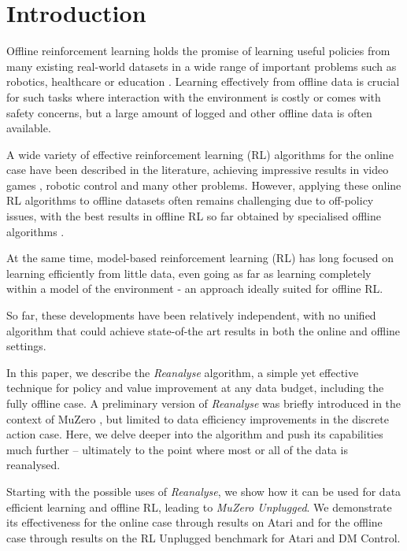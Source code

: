 \documentclass{article}
\newcommand{\reanalyse}{\emph{Reanalyse}}
\newcommand{\mzunplugged}{\emph{MuZero Unplugged}}
\begin{document}
\section{Introduction}

Offline reinforcement learning holds the promise of learning useful policies from many existing real-world datasets in a wide range of important problems such as robotics, healthcare or education \cite{levine2020offline}. Learning effectively from offline data is crucial for such tasks where interaction with the environment is costly or comes with safety concerns, but a large amount of logged and other offline data is often available.

A wide variety of effective reinforcement learning (RL) algorithms for the online case have been described in the literature, achieving impressive results in video games \cite{dqn}, robotic control \cite{akkaya2019solving} and many other problems. However, applying these online RL algorithms to offline datasets often remains challenging due to off-policy issues, with the best results in offline RL so far obtained by specialised offline algorithms \cite{kumar2020conservative,wang2020critic,agarwal2020optimistic}.

At the same time, model-based reinforcement learning (RL) has long focused on learning efficiently from little data, even going as far as learning completely within a model of the environment \cite{hafner:planet} - an approach ideally suited for offline RL.

So far, these developments have been relatively independent, with no unified algorithm that could achieve state-of-the art results in both the online and offline settings.

In this paper, we describe the \reanalyse{} algorithm, a simple yet effective technique for policy and value improvement at any data budget, including the fully offline case. A preliminary version of \reanalyse{} was briefly introduced in the context of MuZero \cite{muzero}, but limited to data efficiency improvements in the discrete action case. Here, we delve deeper into the algorithm and push its capabilities much further -- ultimately to the point where most or all of the data is reanalysed.

Starting with the possible uses of \reanalyse{}, we show how it can be used for data efficient learning and offline RL, leading to \mzunplugged{}. We demonstrate its effectiveness for the online case through results on Atari and for the offline case through results on the RL Unplugged benchmark for Atari and DM Control.
\end{document}
